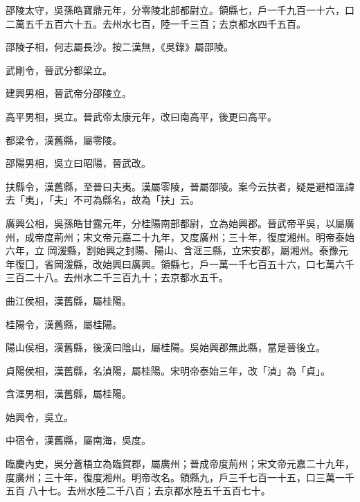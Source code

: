 \begin{pinyinscope}
 邵陵太守，吳孫皓寶鼎元年，分零陵北部都尉立。領縣七，戶一千九百一十六，口二萬五千五百六十五。去州水七百，陸一千三百；去京都水四千五百。



 邵陵子相，何志屬長沙。按二漢無，《吳錄》屬邵陵。



 武剛令，晉武分都梁立。



 建興男相，晉武帝分邵陵立。



 高平男相，吳立。晉武帝太康元年，改曰南高平，後更曰高平。



 都梁令，漢舊縣，屬零陵。



 邵陽男相，吳立曰昭陽，晉武改。



 扶縣令，漢舊縣，至晉曰夫夷。漢屬零陵，晉屬邵陵。案今云扶者，疑是避桓溫諱去「夷」，「夫」不可為縣名，故為「扶」云。



 廣興公相，吳孫皓甘露元年，分桂陽南部都尉，立為始興郡。晉武帝平吳，以屬廣州，成帝度荊州；宋文帝元嘉二十九年，又度廣州；三十年，復度湘州。明帝泰始六年，立
 岡湲縣，割始興之封陽、陽山、含洭三縣，立宋安郡，屬湘州。泰豫元年復囗，省岡湲縣，改始興曰廣興。領縣七，戶一萬一千七百五十六，口七萬六千三百二十八。去州水二千三百九十；去京都水五千。



 曲江侯相，漢舊縣，屬桂陽。



 桂陽令，漢舊縣，屬桂陽。



 陽山侯相，漢舊縣，後漢曰陰山，屬桂陽。吳始興郡無此縣，當是晉後立。



 貞陽侯相，漢舊縣，名湞陽，屬桂陽。宋明帝泰始三年，改「湞」為「貞」。



 含洭男相，漢舊縣，屬桂陽。



 始興令，吳立。



 中宿令，漢舊縣，屬南海，吳度。



 臨慶內史，吳分蒼梧立為臨賀郡，屬廣州；晉成帝度荊州；宋文帝元嘉二十九年，度廣州；三十年，復度湘州。明帝改名。領縣九，戶三千七百一十五，口三萬一千五百
 八十七。去州水陸二千八百；去京都水陸五千五百七十。




\end{pinyinscope}
